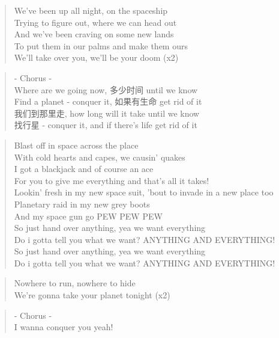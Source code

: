 \begin{verse}
We've been up all night, on the spaceship\\
Trying to figure out, where we can head out\\
And we've been craving on some new lands\\
To put them in our palms and make them ours\\
We'll take over you, we'll be your doom (x2)
\end{verse}

\begin{verse}
- Chorus -\\
Where are we going now, 多少时间 until we know\\
Find a planet - conquer it, 如果有生命 get rid of it\\
我们到那里走, how long will it take until we know\\
找行星 - conquer it, and if there's life get rid of it
\end{verse}

\begin{verse}
Blast off in space across the place\\
With cold hearts and capes, we causin' quakes\\
I got a blackjack and of course an ace\\
For you to give me everything and that's all it takes!\\
Lookin' fresh in my new space suit, 'bout to invade in a new place too\\
Planetary raid in my new grey boots\\
And my space gun go PEW PEW PEW\\
So just hand over anything, yea we want everything\\
Do i gotta tell you what we want? ANYTHING AND EVERYTHING!\\
So just hand over anything, yea we want everything\\
Do i gotta tell you what we want? ANYTHING AND EVERYTHING!
\end{verse}

\begin{verse}
Nowhere to run, nowhere to hide\\
We're gonna take your planet tonight (x2)
\end{verse}

\begin{verse}
- Chorus -\\
I wanna conquer you yeah!
\end{verse}


\clearpage






